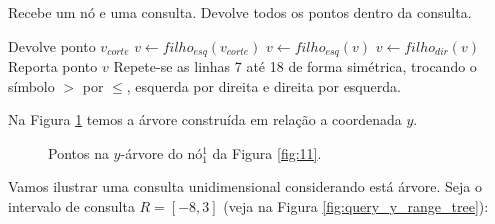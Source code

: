 \begin{algorithm}[h!]
    \caption{Recebe um nó e uma consulta. Devolve todos os pontos dentro da consulta.}
    \begin{algorithmic}[1]
                \State Devolve ponto $v_{corte}$
            \EndIf
        \Else
            \State $v \leftarrow filho_{esq}(v_{corte})$
                    \State {}
                    \State $v \leftarrow filho_{esq}(v)$
                \Else
                    \State $v \leftarrow filho_{dir}(v)$
                \EndIf
            \EndWhile
                \State Reporta ponto $v$
            \EndIf
            \State Repete-se as linhas 7 até 18 de forma simétrica, trocando o símbolo $>$ por $\leq$, esquerda por direita e direita por esquerda.%
        \EndIf
    \EndFunction
    \end{algorithmic}
\end{algorithm}
\clearpage


Na Figura \ref{fig:14} temos a árvore construída em relação a coordenada $y$. 

\begin{figure}[h]
\centering
{}
\caption{Pontos na $y$-árvore do nó$^1_1$ da Figura \ref{fig:11}.}
\label{fig:14}
\end{figure}

Vamos ilustrar uma consulta unidimensional considerando está árvore.
Seja o intervalo de consulta $R = [-8, 3]$ (veja na Figura \ref{fig:query_y_range_tree}):

